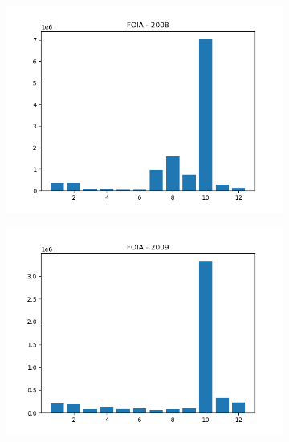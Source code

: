 \documentclass{article}
\begin{document}
\begin{figure}[H]
\begin{subfigure}{.5\textwidth}
    \end{subfigure}
    \begin{subfigure}{.5\textwidth}
        \centering
        \includegraphics[width=\textwidth]{../../output/figures/annual_source_distribution/FOIA_data_dist_2008.png}
    \end{subfigure}
    \begin{subfigure}{.5\textwidth}
        \centering
        \includegraphics[width=\textwidth]{../../output/figures/annual_source_distribution/FOIA_data_dist_2009.png}
    \end{subfigure}
    \begin{subfigure}{.5\textwidth}
        \centering

\end{subfigure}
\end{figure}
\end{document}
